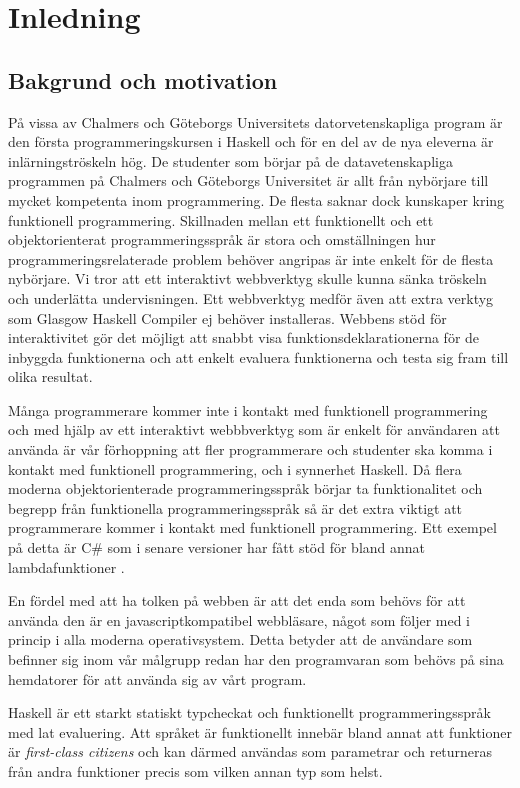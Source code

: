 \section{Inledning}
\subsection{Bakgrund och motivation}
På vissa av Chalmers och Göteborgs Universitets datorvetenskapliga program är den första programmeringskursen i Haskell \citep{haskell98} och för en del av de nya eleverna är inlärningströskeln hög. De studenter som börjar på de datavetenskapliga programmen på Chalmers och Göteborgs Universitet är allt från nybörjare till mycket kompetenta inom programmering. De flesta saknar dock kunskaper kring funktionell programmering. Skillnaden mellan ett funktionellt och ett objektorienterat programmeringsspråk är stora och omställningen hur programmeringsrelaterade problem behöver angripas  är inte enkelt för de flesta nybörjare. Vi tror att ett interaktivt webbverktyg skulle kunna sänka tröskeln och underlätta undervisningen. Ett webbverktyg medför även att extra verktyg som Glasgow Haskell Compiler \citep{ghc} ej behöver installeras. Webbens stöd för interaktivitet gör det möjligt att snabbt visa funktionsdeklarationerna för de inbyggda funktionerna och att enkelt evaluera funktionerna och testa sig fram till olika resultat.

Många programmerare kommer inte i kontakt med funktionell programmering  och med hjälp av ett interaktivt webbbverktyg som är enkelt för användaren att använda är vår förhoppning att fler programmerare och studenter ska komma i kontakt med funktionell programmering, och i synnerhet Haskell. Då flera moderna objektorienterade programmeringsspråk börjar ta funktionalitet och begrepp från funktionella programmeringsspråk så är det extra viktigt att programmerare kommer i kontakt med funktionell programmering. Ett exempel på detta är C\# som i senare versioner har fått stöd för bland annat lambdafunktioner \citep{csharp}. 

En fördel med att ha tolken på webben är att det enda som behövs för att använda den är en javascriptkompatibel webbläsare, något som följer med i princip i alla moderna operativsystem. Detta betyder att de användare som befinner sig inom vår målgrupp redan har den programvaran som behövs på sina hemdatorer för att använda sig av vårt program.  

Haskell är ett starkt statiskt typcheckat och funktionellt programmeringsspråk med lat evaluering. %
Att språket är funktionellt innebär bland annat att funktioner är \emph{first-class citizens} och kan därmed användas som parametrar och returneras från andra funktioner precis som vilken annan typ som helst.

